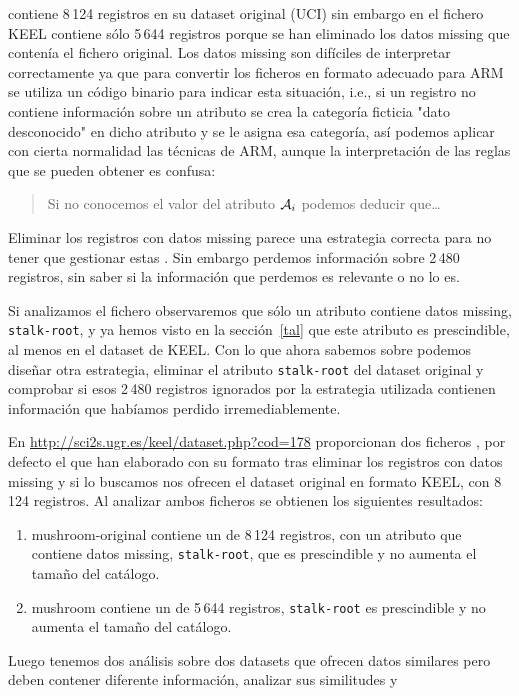 \ABIERTO
\mushroom contiene 8\,124 registros en su dataset original (UCI) sin embargo en el fichero KEEL contiene sólo 5\,644 registros porque se han eliminado los datos missing que contenía el fichero original. Los datos missing son difíciles de interpretar correctamente ya que para convertir los ficheros en formato adecuado para ARM se utiliza un código binario para indicar esta situación, i.e., si un registro no contiene información sobre un atributo se crea la categoría ficticia "dato desconocido" en dicho atributo y se le asigna esa categoría, así podemos aplicar con cierta normalidad las técnicas de ARM, aunque la interpretación de las reglas que se pueden obtener es confusa:

\begin{quote}
Si no conocemos el valor del atributo $\A_i$ podemos deducir que\ldots
\end{quote}

Eliminar los registros con datos missing parece una estrategia correcta para no tener que gestionar estas \ars. Sin embargo perdemos información sobre 2\,480 registros, sin saber si la información que perdemos es relevante o no lo es.

Si analizamos el fichero observaremos que sólo un atributo contiene datos missing, \texttt{stalk-root}, y ya hemos visto en la sección~\ref{tal} que este atributo es prescindible, al menos en el dataset de KEEL. Con lo que ahora sabemos sobre \catalogos podemos diseñar otra estrategia, eliminar el atributo \texttt{stalk-root} del dataset original y comprobar si esos 2\,480 registros ignorados por la estrategia utilizada contienen información que habíamos perdido irremediablemente.

En \href{KEEL - Mushroom}{http://sci2s.ugr.es/keel/dataset.php?cod=178} proporcionan dos ficheros \mushroom, por defecto el que han elaborado con su formato tras eliminar los registros con datos missing y si lo buscamos nos ofrecen el dataset original en formato KEEL, con 8\,124 registros. Al analizar ambos ficheros se obtienen los siguientes resultados:
\begin{enumerate}
  \item mushroom-original contiene un \CC de 8\,124 registros, con un atributo que contiene datos missing, \texttt{stalk-root}, que es prescindible y no aumenta el tamaño del catálogo.
  \item mushroom contiene un \CC de 5\,644 registros, \texttt{stalk-root} es prescindible y no aumenta el tamaño del catálogo.
\end{enumerate}
Luego tenemos dos análisis sobre dos datasets que ofrecen datos similares pero deben contener diferente información, analizar sus similitudes y 